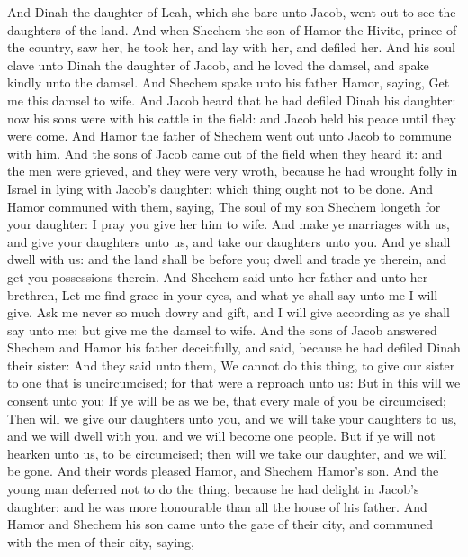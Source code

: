 \begin{biblechapter} %
 And Dinah the daughter of Leah, which she bare unto Jacob, went out to see the daughters of the land.
\verse And when Shechem the son of Hamor the Hivite, prince of the country, saw her, he took her, and lay with her, and defiled her.
\verse And his soul clave unto Dinah the daughter of Jacob, and he loved the damsel, and spake kindly unto the damsel.
\verse And Shechem spake unto his father Hamor, saying, Get me this damsel to wife.
\verse And Jacob heard that he had defiled Dinah his daughter: now his sons were with his cattle in the field: and Jacob held his peace until they were come.
\verse And Hamor the father of Shechem went out unto Jacob to commune with him.
\verse And the sons of Jacob came out of the field when they heard it: and the men were grieved, and they were very wroth, because he had wrought folly in Israel in lying with Jacob's daughter; which thing ought not to be done.
\verse And Hamor communed with them, saying, The soul of my son Shechem longeth for your daughter: I pray you give her him to wife.
\verse And make ye marriages with us, and give your daughters unto us, and take our daughters unto you.
\verse And ye shall dwell with us: and the land shall be before you; dwell and trade ye therein, and get you possessions therein.
\verse And Shechem said unto her father and unto her brethren, Let me find grace in your eyes, and what ye shall say unto me I will give.
\verse Ask me never so much dowry and gift, and I will give according as ye shall say unto me: but give me the damsel to wife.
\verse And the sons of Jacob answered Shechem and Hamor his father deceitfully, and said, because he had defiled Dinah their sister:
\verse And they said unto them, We cannot do this thing, to give our sister to one that is uncircumcised; for that were a reproach unto us:
\verse But in this will we consent unto you: If ye will be as we be, that every male of you be circumcised;
\verse Then will we give our daughters unto you, and we will take your daughters to us, and we will dwell with you, and we will become one people.
\verse But if ye will not hearken unto us, to be circumcised; then will we take our daughter, and we will be gone.
\verse And their words pleased Hamor, and Shechem Hamor's son.
\verse And the young man deferred not to do the thing, because he had delight in Jacob's daughter: and he was more honourable than all the house of his father.
\verse And Hamor and Shechem his son came unto the gate of their city, and communed with the men of their city, saying,

\end{biblechapter}
